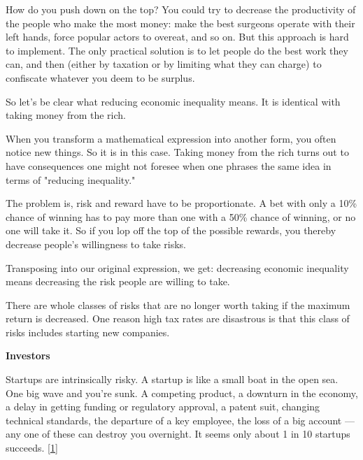 How do you push down on the top? You could
                  try to decrease the productivity of the people who make the
                  most money: make the best surgeons operate with their left
                  hands, force popular actors to overeat, and so on. But this
                  approach is hard to implement. The only practical solution is
                  to let people do the best work they can, and then (either by
                  taxation or by limiting what they can charge) to confiscate
                  whatever you deem to be surplus.

So let's be clear
                  what reducing economic inequality means. It is identical with
                  taking money from the rich.

When you transform a
                  mathematical expression into another form, you often notice
                  new things. So it is in this case. Taking money from the rich
                  turns out to have consequences one might not foresee when one
                  phrases the same idea in terms of "reducing inequality."

The
                  problem is, risk and reward have to be proportionate. A bet
                  with only a 10\% chance of winning has to pay more than one
                  with a 50\% chance of winning, or no one will take it. So if
                  you lop off the top of the possible rewards, you thereby
                  decrease people's willingness to take risks.

Transposing
                  into our original expression, we get: decreasing economic
                  inequality means decreasing the risk people are willing to
                  take.

There are whole classes of risks that are no
                  longer worth taking if the maximum return is decreased. One
                  reason high tax rates are disastrous is that this class of
                  risks includes starting new companies.

\textbf{Investors}

Startups are intrinsically risky. A startup is
                  like a small boat in the open sea. One big wave and you're
                  sunk. A competing product, a downturn in the economy, a delay
                  in getting funding or regulatory approval, a patent suit,
                  changing technical standards, the departure of a key employee,
                  the loss of a big account --- any one of these can destroy
                  you overnight. It seems only about 1 in 10 startups succeeds.
                  [\href{\#f1n}{1}]

